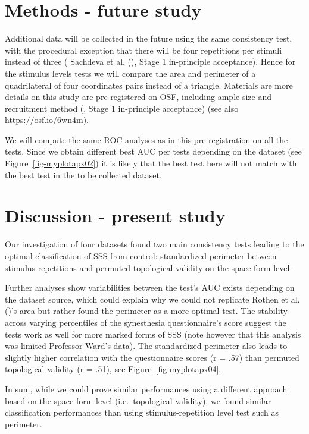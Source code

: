\documentclass[
  man,
  longtable,
  a4paper,
  nolmodern,
  notxfonts,
  notimes,
  colorlinks=true,linkcolor=blue,citecolor=blue,urlcolor=blue]{apa7}
\begin{document}
\section{Methods - future study}\label{sec-phase-ii-methods}

Additional data will be collected in the future using the same
consistency test, with the procedural exception that there will be four
repetitions per stimuli instead of three ( Sachdeva et al.
(), Stage 1 in-principle acceptance).
Hence for the stimulus levels tests we will compare the area and
perimeter of a quadrilateral of four coordinates pairs instead of a
triangle. Materials are more details on this study are pre-registered on
OSF, including ample size and recruitment method
(, Stage 1
in-principle acceptance) (see also \url{https://osf.io/6wn4m}).

We will compute the same ROC analyses as in this pre-registration on all
the tests. Since we obtain different best AUC per tests depending on the
dataset (see Figure~\ref{fig-myplotapx02}) it is likely that the best
test here will not match with the best test in the to be collected
dataset.

\section{Discussion - present study}\label{discussion---present-study}

Our investigation of four datasets found two main consistency tests
leading to the optimal classification of SSS from control: standardized
perimeter between stimulus repetitions and permuted topological validity
on the space-form level.

Further analyses show variabilities between the test's AUC exists
depending on the dataset source, which could explain why we could not
replicate Rothen et al. ()'s area but
rather found the perimeter as a more optimal test. The stability across
varying percentiles of the synesthesia questionnaire's score suggest the
tests work as well for more marked forms of SSS (note however that this
analysis was limited Professor Ward's data). The standardized perimeter
also leads to slightly higher correlation with the questionnaire scores
(r = .57) than permuted topological validity (r = .51), see
Figure~\ref{fig-myplotapx04}.

In sum, while we could prove similar performances using a different
approach based on the space-form level (i.e.~topological validity), we
found similar classification performances than using stimulus-repetition
level test such as perimeter.
\end{document}
